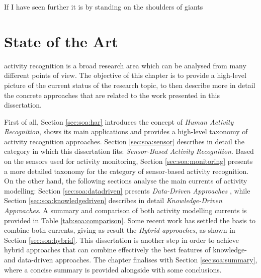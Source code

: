 

\begin{savequote}[50mm]
If I have seen further it is by standing on the shoulders of giants
\end{savequote}

\chapter{State of the Art}
\label{cha:soa}

\ifpdf
    \graphicspath{{2_state_of_the_art/figures/PDF/}{2_state_of_the_art/figures/PNG/}{2_state_of_the_art/figures/}}
\else
    \graphicspath{{2_state_of_the_art/figures/EPS/}{2_state_of_the_art/figures/}}
\fi


 activity recognition is a broad research area which can be analysed from many different points of view. The objective of this chapter is to provide a high-level picture of the current status of the research topic, to then describe more in detail the concrete approaches that are related to the work presented in this dissertation. 

First of all, Section \ref{sec:soa:har} introduces the concept of \textit{Human Activity Recognition}, shows its main applications and provides a high-level taxonomy of activity recognition approaches. Section \ref{sec:soa:sensor} describes in detail the category in which this dissertation fits: \textit{Sensor-Based Activity Recognition}. Based on the sensors used for activity monitoring, Section \ref{sec:soa:monitoring} presents a more detailed taxonomy for the category of sensor-based activity recognition. On the other hand, the following sections analyse the main currents of activity modelling: Section \ref{sec:soa:datadriven} presents \textit{Data-Driven Approaches} , while Section \ref{sec:soa:knowledgedriven} describes in detail \textit{Knowledge-Driven Approaches}. A summary and comparison of both activity modelling currents is provided in Table \ref{tab:soa:comparison}. Some recent work has settled the basis to combine both currents, giving as result the \textit{Hybrid approaches}, as shown in Section \ref{sec:soa:hybrid}. This dissertation is another step in order to achieve hybrid approaches that can combine effectively the best features of knowledge- and data-driven approaches. The chapter finalises with Section \ref{sec:soa:summary}, where a concise summary is provided alongside with some conclusions.